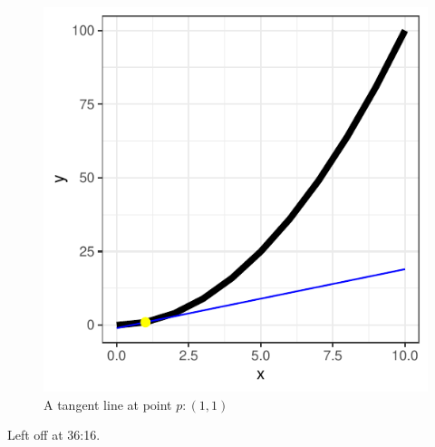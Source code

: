 \documentclass{article}
\begin{document}
\begin{figure}[H]
    \centering
    \includegraphics{tangent.pdf}
    \caption{A tangent line at point $p: (1, 1)$}
    \label{fig:tangent}
\end{figure}

Left off at 36:16.
\end{document}
